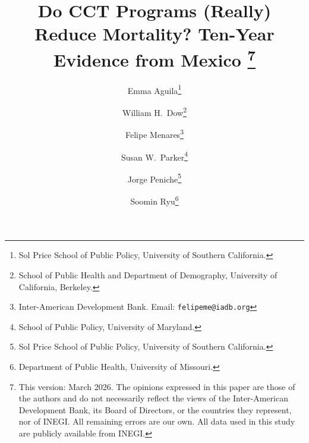\documentclass[12pt]{article}
\begin{document}

\title{\Large{Do CCT Programs (Really) Reduce Mortality? Ten-Year Evidence from Mexico}%
\thanks{This version: March 2026. The opinions expressed in this paper are those of the authors and do not necessarily reflect the views of the Inter-American Development Bank, its Board of Directors, or the countries they represent, nor of INEGI. All remaining errors are our own. All data used in this study are publicly available from INEGI.}}

\author{Emma Aguila\footnote{Sol Price School of Public Policy, University of Southern California.}
\and William H.\ Dow\footnote{School of Public Health and Department of Demography, University of California, Berkeley.}
\and Felipe Menares\footnote{Inter-American Development Bank. Email: \texttt{felipeme@iadb.org}}
\and Susan W.\ Parker\footnote{School of Public Policy, University of Maryland.}
\and Jorge Peniche\footnote{Sol Price School of Public Policy, University of Southern California.}
\and Soomin Ryu\footnote{Department of Public Health, University of Missouri.}}

\date{}
\maketitle
\vspace{-12mm}
\thispagestyle{empty}

\end{document}
